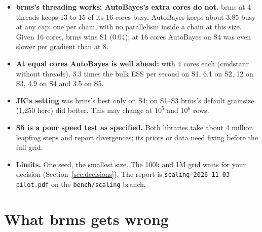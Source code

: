 \documentclass[11pt]{article}
\newcommand{\code}[1]{\texttt{#1}}
\newcommand{\file}[1]{\texttt{#1}}
\begin{document}
\begin{itemize}
\item \textbf{brms's threading works; AutoBayes's extra cores do not.} brms at 4 threads keeps 13 to 15 of its 16 cores
  busy. AutoBayes keeps about 3.85 busy at any cap: one per chain, with no parallelism inside a chain at this size. Given 16
  cores, brms wins S1 (0.64); at 16 cores AutoBayes on S4 was even slower per gradient than at 8.
\item \textbf{At equal cores AutoBayes is well ahead:} with 4 cores each (cmdstanr without threads), 3.3 times the bulk ESS
  per second on S1, 6.1 on S2, 12 on S3, 4.9 on S4 and 3.5 on S5.
\item \textbf{JK's setting} was brms's best only on S4; on S1--S3 brms's default grainsize (1{,}250 here) did better. This
  may change at $10^5$ and $10^6$ rows.
\item \textbf{S5 is a poor speed test as specified.} Both libraries take about 4 million leapfrog steps and report
  divergences; its priors or data need fixing before the full grid.
\item \textbf{Limits.} One seed, the smallest size. The 100k and 1M grid waits for your decision
  (Section~\ref{sec:decisions}). The report is \file{scaling-2026-11-03-pilot.pdf} on the \code{bench/scaling} branch.
\end{itemize}

\section{What brms gets wrong}
\label{sec:brms}
\end{document}

